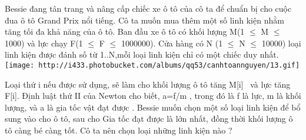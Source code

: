 Bessie đang tân trang và nâng cấp chiếc xe ô tô của cô ta để chuẩn bị cho cuộc đua ô tô Grand Prix nổi tiếng. Cô ta muốn mua thêm một số linh kiện nhằm tăng tối đa khả năng của ô tô. Ban đầu xe ô tô có khối lượng M(1 $\le$  M  $\le$ 1000) và lực chạy F(1 $\le$  F  $\le$ 1000000). Cửa hàng có N (1 $\le$  N  $\le$ 10000) loại linh kiện được đánh số từ 1..N,mỗi loại linh kiện chỉ có một chiếc duy nhất.   
\texttt{[image: http://i433.photobucket.com/albums/qq53/canhtoannguyen/13.gif]}

   Loại thứ i nếu được sử dụng, sẽ làm cho khối lượng ô tô tăng M[i]  và lực tăng F[i]. Định luật thứ II của Newton cho biết, a=f/m , trong đó là f là lực, m là khối lượng, và a là gia tốc vật đạt được . Bessie muốn chọn một số loại linh kiện để bổ sung vào cho ô tô, sau cho Gia tốc đạt được là lớn nhất, đồng thời khối lượng ô tô càng bé càng tốt. Cô ta nên chọn loại những linh kiện nào ?  

\